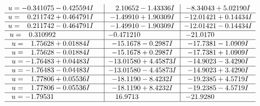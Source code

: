 \documentclass[1p]{elsarticle_modified}
\theoremstyle{definition}
\begin{document}
$$\begin{array}{c|c|c}
\begin{aligned}
u &= -0.341075 - 0.425594 I\end{aligned}
 & \phantom{-}2.10652 - 1.43336 I & -8.34043 + 5.02190 I \\ \hline\begin{aligned}
u &= \phantom{-}0.211742 + 0.464791 I\end{aligned}
 & -1.49910 + 1.90309 I & -12.01421 + 0.14434 I \\ \hline\begin{aligned}
u &= \phantom{-}0.211742 - 0.464791 I\end{aligned}
 & -1.49910 - 1.90309 I & -12.01421 - 0.14434 I \\ \hline\begin{aligned}
u &= \phantom{-}0.310992\phantom{ +0.000000I}\end{aligned}
 & -0.471210\phantom{ +0.000000I} & -21.0170\phantom{ +0.000000I} \\ \hline\begin{aligned}
u &= \phantom{-}1.75628 + 0.01884 I\end{aligned}
 & -15.1678 - 0.2987 I & -17.7381 - 1.0909 I \\ \hline\begin{aligned}
u &= \phantom{-}1.75628 - 0.01884 I\end{aligned}
 & -15.1678 + 0.2987 I & -17.7381 + 1.0909 I \\ \hline\begin{aligned}
u &= -1.76483 + 0.04483 I\end{aligned}
 & -13.01580 + 4.45873 I & -14.9023 - 3.4290 I \\ \hline\begin{aligned}
u &= -1.76483 - 0.04483 I\end{aligned}
 & -13.01580 - 4.45873 I & -14.9023 + 3.4290 I \\ \hline\begin{aligned}
u &= \phantom{-}1.77806 + 0.05536 I\end{aligned}
 & -18.1190 - 8.4232 I & -19.2385 + 4.5719 I \\ \hline\begin{aligned}
u &= \phantom{-}1.77806 - 0.05536 I\end{aligned}
 & -18.1190 + 8.4232 I & -19.2385 - 4.5719 I \\ \hline\begin{aligned}
u &= -1.79531\phantom{ +0.000000I}\end{aligned}
 & \phantom{-}16.9713\phantom{ +0.000000I} & -21.9280\phantom{ +0.000000I}\\
 \hline 
 \end{array}$$\newpage\newpage\renewcommand{\arraystretch}{1}
\end{document}
